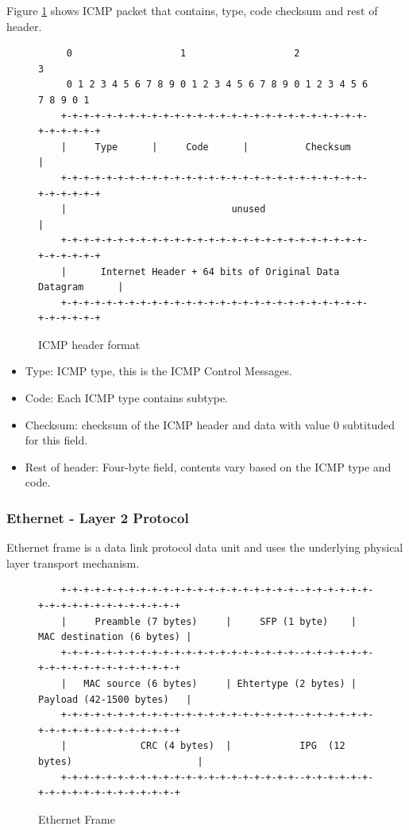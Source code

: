 \documentclass[11pt]{article}
\begin{document}
Figure \ref{fig:icmp} shows ICMP packet that contains, type, code checksum and
rest of header.

\begin{figure}[H]
    \centering
    \footnotesize
    \begin{varwidth}{\linewidth}
    \begin{verbatim}
     0                   1                   2                   3
     0 1 2 3 4 5 6 7 8 9 0 1 2 3 4 5 6 7 8 9 0 1 2 3 4 5 6 7 8 9 0 1
    +-+-+-+-+-+-+-+-+-+-+-+-+-+-+-+-+-+-+-+-+-+-+-+-+-+-+-+-+-+-+-+-+
    |     Type      |     Code      |          Checksum             |
    +-+-+-+-+-+-+-+-+-+-+-+-+-+-+-+-+-+-+-+-+-+-+-+-+-+-+-+-+-+-+-+-+
    |                             unused                            |
    +-+-+-+-+-+-+-+-+-+-+-+-+-+-+-+-+-+-+-+-+-+-+-+-+-+-+-+-+-+-+-+-+
    |      Internet Header + 64 bits of Original Data Datagram      |
    +-+-+-+-+-+-+-+-+-+-+-+-+-+-+-+-+-+-+-+-+-+-+-+-+-+-+-+-+-+-+-+-+
    \end{verbatim}
    \end{varwidth}
    \caption{ICMP header format}\label{fig:icmp}
\end{figure}

\begin{itemize}
    \item Type: ICMP type, this is the ICMP Control Messages.
    \item Code: Each ICMP type contains subtype.
    \item Checksum: checksum of the ICMP header and data with value 0 subtituded for this field.
    \item Rest of header: Four-byte field, contents vary based on the ICMP type and code.
\end{itemize}

\subsubsection{Ethernet - Layer 2 Protocol}

Ethernet frame is a data link protocol data unit and uses the underlying
physical layer transport mechanism.\cite{wiki:ethernet_frame}

\begin{figure}[H]
    \centering
    \footnotesize
    \begin{varwidth}{\linewidth}
    \begin{verbatim}
    +-+-+-+-+-+-+-+-+-+-+-+-+-+-+-+-+-+-+-+-+--+-+-+-+-+-+-+-+-+-+-+-+-+-+-+-+-+-+-+
    |     Preamble (7 bytes)     |     SFP (1 byte)    | MAC destination (6 bytes) |
    +-+-+-+-+-+-+-+-+-+-+-+-+-+-+-+-+-+-+-+-+--+-+-+-+-+-+-+-+-+-+-+-+-+-+-+-+-+-+-+
    |   MAC source (6 bytes)     | Ehtertype (2 bytes) | Payload (42-1500 bytes)   |
    +-+-+-+-+-+-+-+-+-+-+-+-+-+-+-+-+-+-+-+-+--+-+-+-+-+-+-+-+-+-+-+-+-+-+-+-+-+-+-+
    |             CRC (4 bytes)  |            IPG  (12 bytes)                      |
    +-+-+-+-+-+-+-+-+-+-+-+-+-+-+-+-+-+-+-+-+--+-+-+-+-+-+-+-+-+-+-+-+-+-+-+-+-+-+-+
    \end{verbatim}
    \end{varwidth}
    \caption{Ethernet Frame}\label{fig:ethernet_frame}
\end{figure}
\end{document}

